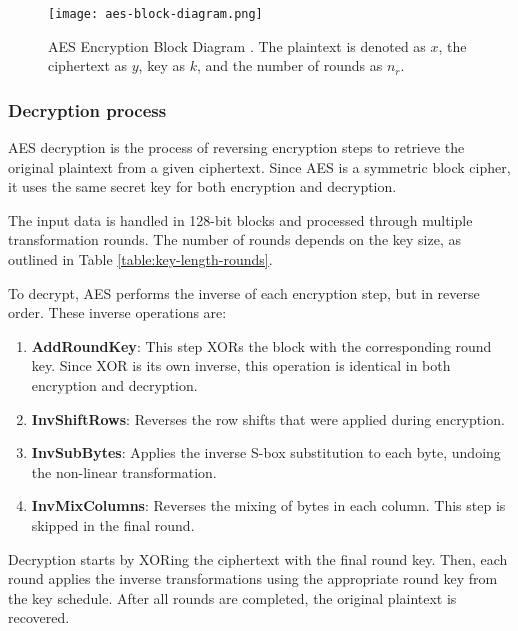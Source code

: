 \begin{figure}[!ht]
    \centering
    \texttt{[image: aes-block-diagram.png]} %
    \caption{
        AES Encryption Block Diagram \cite{Paar2024}.
        The plaintext is denoted as $x$, the ciphertext as $y$, key as $k$, and the number of rounds as $n_r$.
    }
    \label{fig:aes-block-diagram}
\end{figure}


\subsubsection{Decryption process}
\label{sec:decryption}

AES decryption is the process of reversing encryption steps to retrieve the original plaintext from a given ciphertext. Since AES is a symmetric block cipher, it uses the same secret key for both encryption and decryption\cite{NIST_AES}.

The input data is handled in 128-bit blocks and processed through multiple transformation rounds. 
The number of rounds depends on the key size, as outlined in Table \ref{table:key-length-rounds}.

To decrypt, AES performs the inverse of each encryption step, but in reverse order. These inverse operations are:

\begin{enumerate}
    \item \textbf{AddRoundKey}: This step XORs the block with the corresponding round key. Since XOR is its own inverse, this operation is identical in both encryption and decryption.
    \item \textbf{InvShiftRows}: Reverses the row shifts that were applied during encryption.
    \item \textbf{InvSubBytes}: Applies the inverse S-box substitution to each byte, undoing the non-linear transformation.
    \item \textbf{InvMixColumns}: Reverses the mixing of bytes in each column. This step is skipped in the final round.
\end{enumerate}

Decryption starts by XORing the ciphertext with the final round key. Then, each round applies the inverse transformations using the appropriate round key from the key schedule. After all rounds are completed, the original plaintext is recovered.

